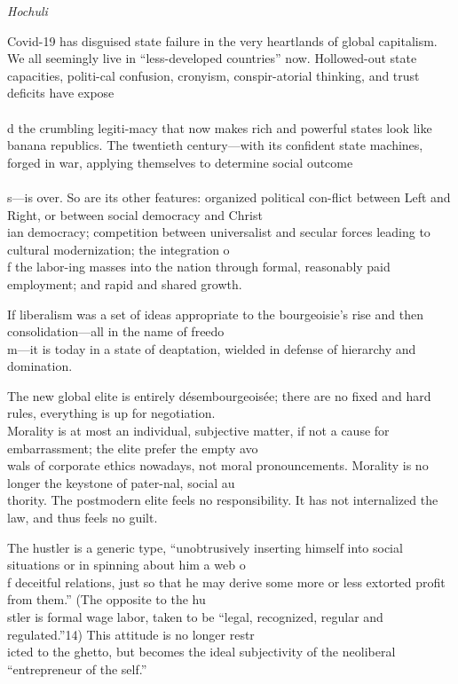 \documentclass[
]{book}
\begin{document}
\emph{Hochuli}

Covid-19 has disguised state failure in the very heartlands of global capitalism.
We all seemingly live in ``less-developed countries'' now.
Hollowed-out state capacities, politi-cal confusion, cronyism, conspir-atorial thinking, and trust deficits have expose\\
~\\
d the crumbling legiti-macy that now makes rich and powerful states look like banana republics.
The twentieth century---with its confident state machines, forged in war, applying themselves to determine social outcome\\
~\\
s---is over.
So are its other features: organized political con-flict between Left and Right, or between social democracy and Christ\\
ian democracy; competition between universalist and secular forces leading to cultural modernization; the integration o\\
f the labor-ing masses into the nation through formal, reasonably paid employment; and rapid and shared growth.

If liberalism was a set of ideas appropriate to the bourgeoisie's rise and then consolidation---all in the name of freedo\\
m---it is today in a state of deaptation, wielded in defense of hierarchy and domination.

The new global elite is entirely désembourgeoisée; there are no fixed and hard rules, everything is up for negotiation.\\
Morality is at most an individual, subjective matter, if not a cause for embarrassment; the elite prefer the empty avo\\
wals of corporate ethics nowadays, not moral pronouncements. Morality is no longer the keystone of pater-nal, social au\\
thority. The postmodern elite feels no responsibility. It has not internalized the law, and thus feels no guilt.

The hustler is a generic type, ``unobtrusively inserting himself into social situations or in spinning about him a web o\\
f deceitful relations, just so that he may derive some more or less extorted profit from them.'' (The opposite to the hu\\
stler is formal wage labor, taken to be ``legal, recognized, regular and regulated.''14) This attitude is no longer restr\\
icted to the ghetto, but becomes the ideal subjectivity of the neoliberal ``entrepreneur of the self.''
\end{document}
